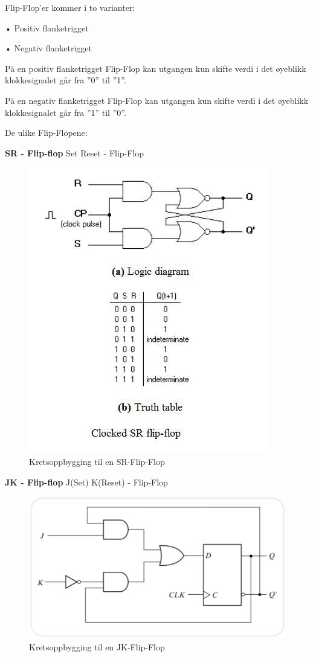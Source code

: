 \documentclass{article}
\begin{document}
	Flip-­Flop’er kommer  i  to  varianter:
	
	• Positiv flanketrigget
	
	• Negativ flanketrigget
	
	På  en  positiv  flanketrigget  Flip-­Flop kan  utgangen  kun  
	skifte  verdi  i  det  øyeblikk  klokkesignalet  går  fra ”0”  til ”1”.
	
	På  en  negativ  flanketrigget  Flip-­Flop  kan  utgangen  
	kun  skifte  verdi  i  det  øyeblikk  klokkesignalet  går  fra
	”1”  til ”0”.
	
	De ulike Flip-Flopene:
	
	\textbf{SR - Flip-flop}
	Set Reset - Flip-Flop
	
	\begin{figure}[H]
		\includegraphics[scale = 0.6]{srFlip.jpg}
		\caption{Kretsoppbygging til en SR-Flip-Flop}
	\end{figure}
	
	\textbf{JK - Flip-flop}
	J(Set) K(Reset) - Flip-Flop
	
	\begin{figure}[H]
		\includegraphics[scale = 0.6]{jkFlip.jpg}
		\caption{Kretsoppbygging til en JK-Flip-Flop}
	\end{figure}
	
\end{document}
